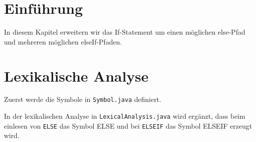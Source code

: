 \section{Einführung}
In diesem Kapitel erweitern wir das If-Statement um einen möglichen else-Pfad und mehreren möglichen elseIf-Pfaden.


\section{Lexikalische Analyse}
Zuerst werde die Symbole in  \verb|Symbol.java| definiert.

In der lexikalischen Analyse in \verb|LexicalAnalysis.java| wird ergänzt, dass beim einlesen von \verb|ELSE| das Symbol ELSE und bei 
\verb|ELSEIF| das Symbol ELSEIF erzeugt wird.


